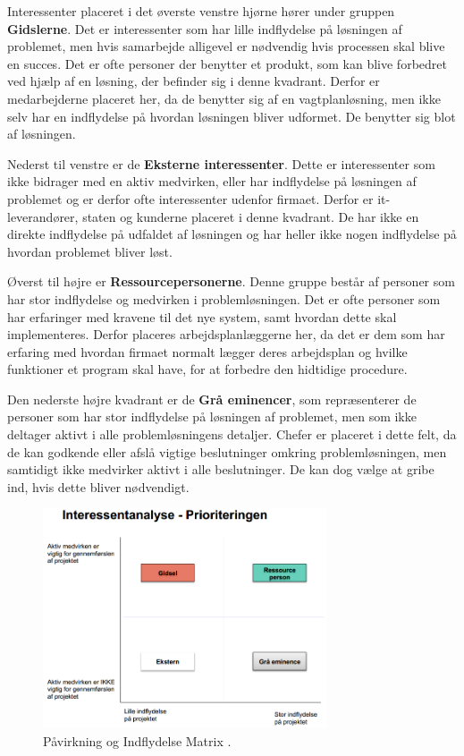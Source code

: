 Interessenter placeret i det øverste venstre hjørne hører under gruppen \textbf{Gidslerne}. Det er interessenter som har lille indflydelse på løsningen af problemet, men hvis samarbejde alligevel er nødvendig hvis processen skal blive en succes. Det er ofte personer der benytter et produkt, som kan blive forbedret ved hjælp af en løsning, der befinder sig i denne kvadrant. Derfor er medarbejderne placeret her, da de benytter sig af en vagtplanløsning, men ikke selv har en indflydelse på hvordan løsningen bliver udformet. De benytter sig blot af løsningen. 

Nederst til venstre er de \textbf{Eksterne interessenter}. Dette er interessenter som ikke bidrager med en aktiv medvirken, eller har indflydelse på løsningen af problemet og er derfor ofte interessenter udenfor firmaet. Derfor er it-leverandører, staten og kunderne placeret i denne kvadrant. De har ikke en direkte indflydelse på udfaldet af løsningen og har heller ikke nogen indflydelse på hvordan problemet bliver løst. 

Øverst til højre er \textbf{Ressourcepersonerne}. Denne gruppe består af personer som har stor indflydelse og medvirken i problemløsningen. Det er ofte personer som har erfaringer med kravene til det nye system, samt hvordan dette skal implementeres. Derfor placeres arbejdsplanlæggerne  her, da det er dem som har erfaring med hvordan firmaet normalt lægger deres arbejdsplan og hvilke funktioner et program skal have, for at forbedre den hidtidige procedure. 

Den nederste højre kvadrant er de \textbf{Grå eminencer}, som repræsenterer de personer som har stor indflydelse på løsningen af problemet, men som ikke deltager aktivt i alle problemløsningens detaljer. Chefer er placeret i dette felt, da de kan godkende eller afslå vigtige beslutninger omkring problemløsningen, men samtidigt ikke medvirker aktivt i alle beslutninger. De kan dog vælge at gribe ind, hvis dette bliver nødvendigt.

\begin{figure}[h]
    \centering
    \includegraphics[width=0.75\textwidth]{figures/Udklip.PNG}
    \caption{Påvirkning og Indflydelse Matrix \citep{Holgaard2014}.} 
    \label{fig:PåvirkInflydMat}
\end{figure}

